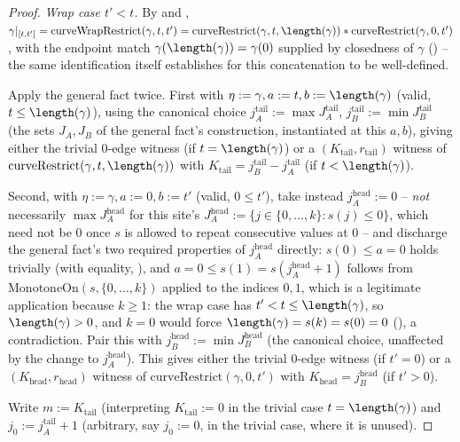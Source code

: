 \begin{proof}
  \emph{Wrap case $t'<t$.} By  and , $\gamma|_{[t,t']}
  = \mathrm{curveWrapRestrict}(\gamma,t,t') = \mathrm{curveRestrict}(\gamma,t,\length(\gamma)) *
  \mathrm{curveRestrict}(\gamma,0,t')$, with the endpoint match
  $\gamma(\length(\gamma))=\gamma(0)$ supplied by closedness of $\gamma$
  () -- the same identification  itself
  establishes for this concatenation to be well-defined.

  Apply the general fact twice. First with $\eta:=\gamma,a:=t,b:=\length(\gamma)$ (valid, $t \le
  \length(\gamma)$), using the canonical choice $j_A^{\mathrm{tail}}:=\max J_A^{\mathrm{tail}}$,
  $j_B^{\mathrm{tail}}:=\min J_B^{\mathrm{tail}}$ (the sets $J_A,J_B$ of the general fact's
  construction, instantiated at this $a,b$), giving either the trivial $0$-edge witness (if
  $t=\length(\gamma)$) or a $(K_{\mathrm{tail}},r_{\mathrm{tail}})$ witness of
  $\mathrm{curveRestrict}(\gamma,t,\length(\gamma))$ with $K_{\mathrm{tail}}=j_B^{\mathrm{tail}}-
  j_A^{\mathrm{tail}}$ (if $t<\length(\gamma)$).

  Second, with $\eta:=\gamma,a:=0,b:=t'$ (valid, $0\le t'$), take instead
  $j_A^{\mathrm{head}}:=0$ -- \emph{not} necessarily $\max J_A^{\mathrm{head}}$ for this site's
  $J_A^{\mathrm{head}}:=\{j\in\{0,\dots,k\}:s(j)\le0\}$, which need not be $0$ once $s$ is allowed
  to repeat consecutive values at $0$ -- and discharge the general fact's two required properties
  of $j_A^{\mathrm{head}}$ directly: $s(0)\le a=0$ holds trivially (with equality,
  ), and $a=0\le s(1)=s(j_A^{\mathrm{head}}+1)$ follows from
  $\mathrm{MonotoneOn}(s,\{0,\dots,k\})$ applied to the indices $0,1$, which is a legitimate
  application because $k\ge1$: the wrap case has $t'<t\le\length(\gamma)$, so $\length(\gamma)>0$,
  and $k=0$ would force $\length(\gamma)=s(k)=s(0)=0$ (), a
  contradiction. Pair this with $j_B^{\mathrm{head}}:=\min J_B^{\mathrm{head}}$ (the canonical
  choice, unaffected by the change to $j_A^{\mathrm{head}}$). This gives either the trivial
  $0$-edge witness (if $t'=0$) or a $(K_{\mathrm{head}},r_{\mathrm{head}})$ witness of
  $\mathrm{curveRestrict}(\gamma,0,t')$ with $K_{\mathrm{head}}=j_B^{\mathrm{head}}$ (if $t'>0$).

  Write $m:=K_{\mathrm{tail}}$ (interpreting $K_{\mathrm{tail}}:=0$ in the trivial case
  $t=\length(\gamma)$) and $j_0:=j_A^{\mathrm{tail}}+1$ (arbitrary, say $j_0:=0$, in the trivial
  case, where it is unused).


\end{proof}
